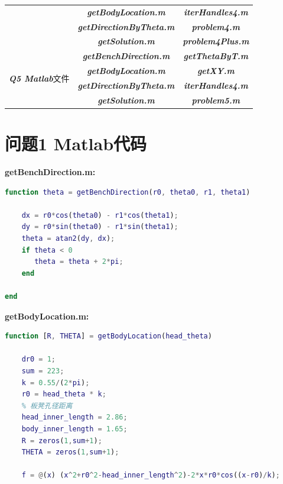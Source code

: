 \documentclass[withoutpreface,bwprint]{cumcmthesis} %
\begin{document}
\begin{appendices}
\begin{center}
{\begin{table}[!htbp]
\begin{tabular}{ccc}
        &\textbf{\textit{getBodyLocation.m}}&\textbf{\textit{iterHandles4.m}}\\
        &\textbf{\textit{getDirectionByTheta.m}}&\textbf{\textit{problem4.m}}\\
        &\textbf{\textit{getSolution.m}}&\textbf{\textit{problem4Plus.m}}\\
        \hline
        \multirow{4}{*}{\textbf{\textit{Q5 Matlab}}文件}
        &\textbf{\textit{getBenchDirection.m}}&\textbf{\textit{getThetaByT.m}}\\
        &\textbf{\textit{getBodyLocation.m}}&\textbf{\textit{getXY.m}}\\
        &\textbf{\textit{getDirectionByTheta.m}}&\textbf{\textit{iterHandles4.m}}\\
        &\textbf{\textit{getSolution.m}}&\textbf{\textit{problem5.m}}\\ 
        \bottomrule[2pt]
    \end{tabular}
\end{table}
}
\end{center}

\section{问题1 Matlab代码}
\noindent\textbf{\textcolor[rgb]{0.98,0.00,0.00}{getBenchDirection.m:}}
\begin{lstlisting}[language=matlab]
% 输入两个点的极坐标，输出两个点向量与x轴正方向的夹角，即板凳方向
function theta = getBenchDirection(r0, theta0, r1, theta1)

    dx = r0*cos(theta0) - r1*cos(theta1);
    dy = r0*sin(theta0) - r1*sin(theta1);
    theta = atan2(dy, dx);
    if theta < 0
       theta = theta + 2*pi; 
    end

end
\end{lstlisting}
\noindent\textbf{\textcolor[rgb]{0.98,0.00,0.00}{getBodyLocation.m:}}
\begin{lstlisting}[language=matlab]
% 输入龙头相角，输出整条龙包括龙头、龙身、龙尾的位置（极坐标）
function [R, THETA] = getBodyLocation(head_theta)

    dr0 = 1;
    sum = 223;
    k = 0.55/(2*pi);
    r0 = head_theta * k;
    % 板凳孔径距离
    head_inner_length = 2.86;
    body_inner_length = 1.65;
    R = zeros(1,sum+1);
    THETA = zeros(1,sum+1);
    
    f = @(x) (x^2+r0^2-head_inner_length^2)-2*x*r0*cos((x-r0)/k);
    

\end{lstlisting}
\end{appendices}
\end{document}
